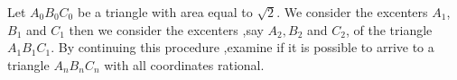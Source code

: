 Let $A_0B_0C_0$ be a triangle with area equal to $\sqrt 2$. We consider the excenters $A_1$, $B_1$ and $C_1$ then we consider the excenters ,say $A_2,B_2$ and $C_2$, of the triangle $A_1B_1C_1$. By continuing this procedure ,examine if it is possible to arrive to a triangle $A_nB_nC_n$ with all coordinates rational.